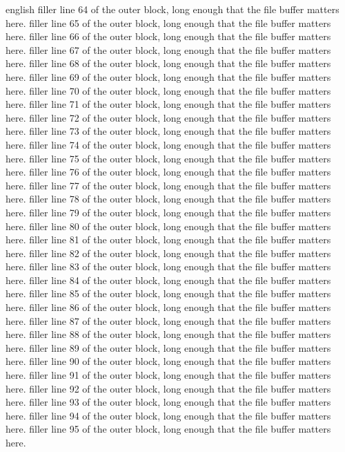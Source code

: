 \documentclass{article}
\begin{document}
\begin{onlyin}{english}
filler line 64 of the outer block, long enough that the file buffer matters here.
filler line 65 of the outer block, long enough that the file buffer matters here.
filler line 66 of the outer block, long enough that the file buffer matters here.
filler line 67 of the outer block, long enough that the file buffer matters here.
filler line 68 of the outer block, long enough that the file buffer matters here.
filler line 69 of the outer block, long enough that the file buffer matters here.
filler line 70 of the outer block, long enough that the file buffer matters here.
filler line 71 of the outer block, long enough that the file buffer matters here.
filler line 72 of the outer block, long enough that the file buffer matters here.
filler line 73 of the outer block, long enough that the file buffer matters here.
filler line 74 of the outer block, long enough that the file buffer matters here.
filler line 75 of the outer block, long enough that the file buffer matters here.
filler line 76 of the outer block, long enough that the file buffer matters here.
filler line 77 of the outer block, long enough that the file buffer matters here.
filler line 78 of the outer block, long enough that the file buffer matters here.
filler line 79 of the outer block, long enough that the file buffer matters here.
filler line 80 of the outer block, long enough that the file buffer matters here.
filler line 81 of the outer block, long enough that the file buffer matters here.
filler line 82 of the outer block, long enough that the file buffer matters here.
filler line 83 of the outer block, long enough that the file buffer matters here.
filler line 84 of the outer block, long enough that the file buffer matters here.
filler line 85 of the outer block, long enough that the file buffer matters here.
filler line 86 of the outer block, long enough that the file buffer matters here.
filler line 87 of the outer block, long enough that the file buffer matters here.
filler line 88 of the outer block, long enough that the file buffer matters here.
filler line 89 of the outer block, long enough that the file buffer matters here.
filler line 90 of the outer block, long enough that the file buffer matters here.
filler line 91 of the outer block, long enough that the file buffer matters here.
filler line 92 of the outer block, long enough that the file buffer matters here.
filler line 93 of the outer block, long enough that the file buffer matters here.
filler line 94 of the outer block, long enough that the file buffer matters here.
filler line 95 of the outer block, long enough that the file buffer matters here.

\end{onlyin}
\end{document}
